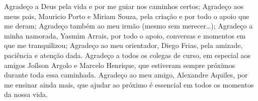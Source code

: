 Agradeço a Deus pela vida e por me guiar nos caminhos certos; Agradeço aos meus pais, Mauricio Porto e Miriam Souza, pela criação e por todo o apoio que me deram; Agradeço também ao meu irmão (mesmo sem merecer\ldots); Agradeço a minha namorada, Yasmim Arrais, por todo o apoio, conversas e momentos em que me tranquilizou; Agradeço ao meu orientador, Diego Frias, pela amizade, paciência e atenção dada. Agradeço a todos os colegas de curso, em especial aos amigos Joílson Argolo e Marcelo Henrique, que estiveram sempre próximos durante toda essa caminhada. Agradeço ao meu amigo, Alexandre Aquiles, por me ensinar ainda mais, que ajudar ao próximo é essencial em todos os momentos da nossa vida.